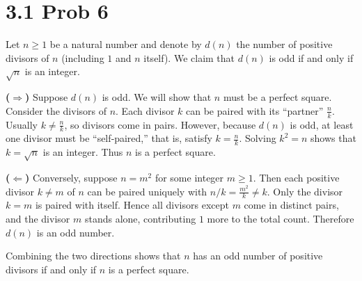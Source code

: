 \documentclass{report}
\begin{document}
\section*{3.1 Prob 6}


\begin{proofWithHibiscus}
  Let $n \ge 1$ be a natural number and denote by $d(n)$ the number of positive divisors of $n$ (including $1$ and $n$ itself). We claim that $d(n)$ is odd if and only if $\sqrt{n}$ is an integer.

  \smallskip
  \noindent
  \textbf{(\(\Longrightarrow\))} 
  Suppose $d(n)$ is odd. We will show that $n$ must be a perfect square. 
  Consider the divisors of $n$. Each divisor $k$ can be paired with its “partner” $\tfrac{n}{k}$. 
  Usually $k \neq \tfrac{n}{k}$, so divisors come in pairs. However, because $d(n)$ is odd, at least one divisor must be “self‐paired,” that is, satisfy $k = \tfrac{n}{k}$. Solving $k^2 = n$ shows that $k = \sqrt{n}$ is an integer. Thus $n$ is a perfect square.

  \smallskip
  \noindent
  \textbf{(\(\Longleftarrow\))} 
  Conversely, suppose $n = m^2$ for some integer $m \ge 1$. Then each positive divisor $k \neq m$ of $n$ can be paired uniquely with $n/k = \tfrac{m^2}{k} \neq k$. Only the divisor $k = m$ is paired with itself. Hence all divisors except $m$ come in distinct pairs, and the divisor $m$ stands alone, contributing $1$ more to the total count. Therefore $d(n)$ is an odd number.

  \medskip
  Combining the two directions shows that $n$ has an odd number of positive divisors if and only if $n$ is a perfect square.
\end{proofWithHibiscus}
\end{document}
